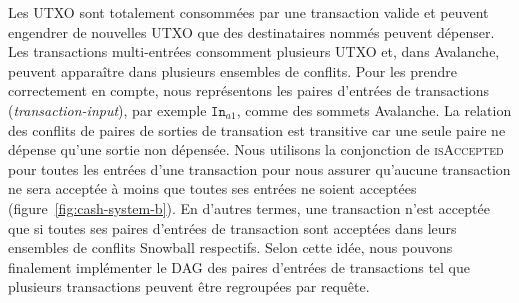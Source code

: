 \documentclass[a4,twocolumn,10pt]{article}
\theoremstyle{definition}
\begin{document}
Les UTXO sont totalement consommées par une transaction valide et peuvent engendrer de nouvelles UTXO que des destinataires nommés peuvent dépenser.
Les transactions multi-entrées consomment plusieurs UTXO et, dans Avalanche, peuvent apparaître dans plusieurs ensembles de conflits.
Pour les prendre correctement en compte, nous représentons les paires d'entrées de transactions (\emph{transaction-input}), par exemple $\texttt{In}_{a1}$, comme des sommets Avalanche.
La relation des conflits de paires de sorties de transation est transitive car une seule paire ne dépense qu'une sortie non dépensée.
Nous utilisons la conjonction de \textsc{isAccepted} pour toutes les entrées d'une transaction pour nous assurer qu'aucune transaction ne sera acceptée à moins que toutes ses entrées ne soient acceptées (figure~\ref{fig:cash-system-b}). En d'autres termes, une transaction n'est acceptée que si toutes ses paires d'entrées de transaction sont acceptées dans leurs ensembles de conflits Snowball respectifs.
Selon cette idée, nous pouvons finalement implémenter le DAG des paires d'entrées de transactions tel que plusieurs transactions peuvent être regroupées par requête.


\end{document}
